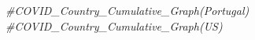 \documentclass[]{tufte-handout}
\newenvironment{Shaded}{}{}
\newcommand{\CommentTok}[1]{\textcolor[rgb]{0.38,0.63,0.69}{\textit{#1}}}
\newcommand{\KeywordTok}[1]{\textcolor[rgb]{0.00,0.44,0.13}{\textbf{#1}}}
\newcommand{\NormalTok}[1]{#1}
\begin{document}
\begin{Shaded}
\begin{Highlighting}[]
{{{  \KeywordTok{return}\NormalTok{(a)}
  
\NormalTok{\}}
\end{Highlighting}
\end{Shaded}

\begin{Shaded}
\begin{Highlighting}[]
\CommentTok{#COVID_Country_Cumulative_Graph(Portugal)}
\CommentTok{#COVID_Country_Cumulative_Graph(US)}
\end{Highlighting}
\end{Shaded}
\end{document}
